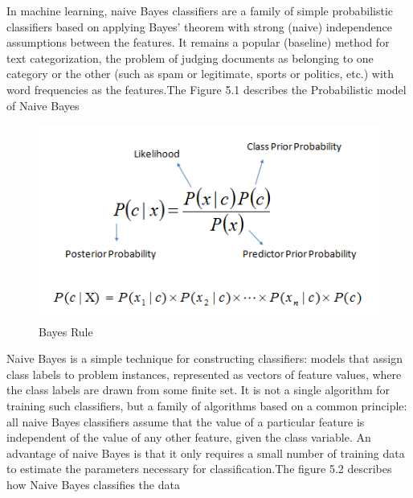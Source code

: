 \documentclass[paper=a4, fontsize=12pt]{scrartcl}
\numberwithin{equation}{section}		%
\numberwithin{figure}{section}			%
\numberwithin{table}{section}				%
\begin{document}
In machine learning, naive Bayes classifiers are a family of simple probabilistic classifiers based on applying Bayes' theorem with strong (naive) independence assumptions between the features. It remains a popular (baseline) method for text categorization, the problem of judging documents as belonging to one category or the other (such as spam or legitimate, sports or politics, etc.) with word frequencies as the features.The Figure 5.1 describes the Probabilistic model of Naive Bayes
\begin{figure}[H]

\begin{center}

\includegraphics[scale=.4]{Bayes_rule.png}

 \end{center}

  \caption{Bayes Rule}

  \label{fig:}

\end{figure}

Naive Bayes is a simple technique for constructing classifiers: models that assign class labels to problem instances, represented as vectors of feature values, where the class labels are drawn from some finite set. It is not a single algorithm for training such classifiers, but a family of algorithms based on a common principle: all naive Bayes classifiers assume that the value of a particular feature is independent of the value of any other feature, given the class variable. 
An advantage of naive Bayes is that it only requires a small number of training data to estimate the parameters necessary for classification.The figure 5.2
describes how Naive Bayes classifies the data
\end{document}
